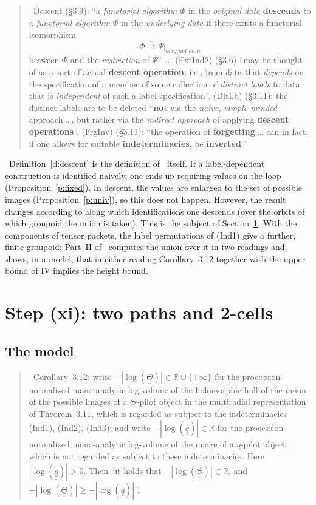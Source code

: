 \documentclass[11pt,a4paper]{article}
\newcommand{\R}{\mathbb{R}}
\newcommand{\qq}{\underline{\underline{q}}{}}
\newcommand{\Th}{\underline{\underline{\Theta}}{}}
\newcommand{\lab}[2]{{\upshape\fcolorbox{#1}{#1!8}{\scriptsize\sffamily\bfseries\textcolor{#1}{#2}}}}
\newcommand{\tagS}{\lab{blue}{S}}
\newcommand{\tagH}{\lab{BurntOrange}{H}}
\newcommand{\srcquote}[2]{\begin{quote}\small\tagS\ #1\par\nopagebreak\hfill{\footnotesize #2}\end{quote}}
\newcommand{\q}[1]{``#1''}
\theoremstyle{plain}
\theoremstyle{definition}
\theoremstyle{remark}
\begin{document}
\srcquote{Descent (\S3.9): \q{a \emph{functorial algorithm} $\Phi$ in the \emph{original data} \textbf{descends} to a
\emph{functorial algorithm} $\Psi$ in the \emph{underlying data} if there exists a functorial isomorphism
\[\Phi\stackrel{\sim}{\to}\Psi|_{\textit{original data}}\]
between $\Phi$ and the \emph{restriction} of $\Psi$} \dots. (ExtInd2) (\S3.6) \q{may be thought of as a sort of actual
\textbf{descent operation}, i.e., from data that \emph{depends} on the specification of a member of some collection of
\emph{distinct labels} to data that is \emph{independent} of such a label specification}. (DltLb) (\S3.11): the distinct
labels are to be deleted \q{\textbf{not} via the \emph{naive, simple-minded} approach \dots, but rather via the
\emph{indirect approach} of applying \textbf{descent operations}}. (FrgInv) (\S3.11): \q{the operation of
\textbf{forgetting} \dots{} can in fact, if one allows for suitable \textbf{indeterminacies}, be
\textbf{inverted}.}}{\cite[\S3.9, \S3.6, \S3.11]{Ess}}

\tagH\ Definition~\ref{d:descent} is the definition of~\cite[\S3.9]{Ess} itself. If a label-dependent construction is
identified naively, one ends up requiring values on the loop (Proposition~\ref{p:fixed}). In descent, the values are
enlarged to the set of possible images (Proposition~\ref{p:univ}), so this does not happen. However, the result
changes according to along which identifications one descends (over the orbits of which groupoid the union is taken).
This is the subject of Section~\ref{s:step}. With the components of tensor packets, the label permutations of (Ind1)
give a further, finite groupoid; Part~II of~\cite{UE} computes the union over it in two readings and shows, in a model,
that in either reading Corollary~3.12 together with the upper bound of IV implies the height bound.

\section{Step (xi): two paths and 2-cells}\label{s:step}

\subsection{The model}
\srcquote{Corollary~3.12: write $-|\log(\Th)|\in\R\cup\{+\infty\}$ for the procession-normalized mono-analytic
log-volume of the holomorphic hull of the union of the possible images of a $\Theta$-pilot object in the multiradial
representation of Theorem~3.11, which is regarded as subject to the indeterminacies (Ind1), (Ind2), (Ind3); and write
$-|\log(\qq)|\in\R$ for the procession-normalized mono-analytic log-volume of the image of a $q$-pilot object, which is not
regarded as subject to these indeterminacies. Here $|\log(\qq)|>0$. Then \q{it holds that
$-|\log(\underline{\underline{\Theta}})|\in\mathbb{R}$, and
$-|\log(\underline{\underline{\Theta}})|\geq-|\log(\underline{\underline{q}})|$}.}{\cite[Cor.~3.12]{IUT3}}
\end{document}
